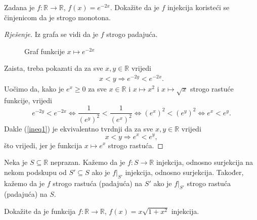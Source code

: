 \begin{exercise}
Zadana je $f : \mathbb{R}\to \mathbb{R}$, $f(x)=e^{-2x}$. Dokažite da je $f$ injekcija koristeći se činjenicom da je strogo monotona.
\end{exercise}
\begin{proof}[Rješenje]
Iz grafa se vidi da je $f$ strogo padajuća. 
\begin{figure}[ht]
\begin{center}
\end{center}
\caption{\label{grexp} Graf funkcije $x\mapsto e^{-2x}$}
\end{figure}

Zaista, treba pokazati da za sve $x, y\in \mathbb{R}$ vrijedi
\begin{gather}
\label{ineq1}
x<y\Rightarrow e^{-2y}<e^{-2x}.
\end{gather}
Uočimo da, kako je $e^x\geq 0$ za sve $x\in \mathbb{R}$ i $x\mapsto x^2$ i $x\mapsto \sqrt{x}$ strogo rastuće funkcije, vrijedi
$$e^{-2y}<e^{-2x}\Leftrightarrow \dfrac{1}{\left(e^{y}\right)^2}<\dfrac{1}{\left(e^{x}\right)^2}\Leftrightarrow \left(e^{x}\right)^2<\left(e^{y}\right)^2\Leftrightarrow e^x<e^y.$$
Dakle (\ref{ineq1}) je ekvivalentno tvrdnji da za sve $x,y\in \mathbb{R}$ vrijedi $$x<y\Rightarrow e^x<e^y,$$
što vrijedi, jer je funkcija $x\mapsto e^x$ strogo rastuća.
\end{proof}
\begin{definition}
Neka je $S\subseteq \mathbb{R}$ neprazan. Kažemo da je $f : S\to \mathbb{R}$ injekcija, odnosno surjekcija na nekom podskupu od $S'\subseteq S$ ako je $f|_{S'}$ injekcija, odnosno surjekcija. Također, kažemo da je $f$ strogo rastuća (padajuća) na $S'$ ako je $f|_{S'}$ strogo rastuća (padajuća) na $S$.
\end{definition}
\begin{exercise}
Dokažite da je funkcija $f : \mathbb{R}\to \mathbb{R}$, $f(x)=x\sqrt{1+x^2}$ injekcija.
\end{exercise}
